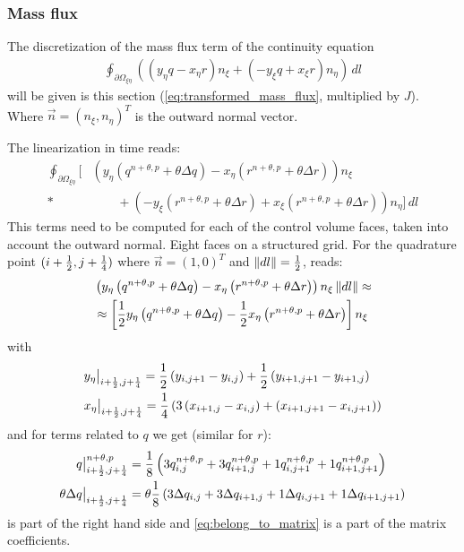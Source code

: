 \subsubsection{Mass flux}
The discretization of the mass flux term of the continuity equation
\begin{align}
    \oint_{\partial\Omega_{\xi\eta}} \left( \left( y_{\eta} q - x_{\eta} r \right)n_\xi + \left( -y_{\xi} q + x_{\xi} r \right) n_\eta \right)\, dl
\end{align}
will be given is this section (\autoref{eq:transformed_mass_flux}, multiplied by $J$).
Where $\vec{n} = (n_\xi, n_\eta)^T$ is the outward normal vector.

The linearization in time reads:
\begin{align}
    \oint_{\partial\Omega_{\xi\eta}} \Big[&\left( y_\eta\left(q^{n+\theta, p} + \theta \Delta q\right) - x_\eta \left( r^{n+\theta, p} + \theta \Delta r  \right)
    \right) n_{\xi}
    \nonumber\\*
    &\qquad  + \left(-y_\xi\left(r^{n+\theta, p} + \theta \Delta r\right) +
      x_\xi\left( r^{n+\theta, p} + \theta \Delta r  \right) \right) n_\eta
      \Big]\, dl
\end{align}
This terms need to be computed for each of the control volume faces, taken into account the outward normal.
Eight faces on a structured grid.
For the quadrature point $(i+\frac{1}{2}, j+\frac{1}{4})$ where $\vec{n} = (1,0)^T$ and $\left\lVert dl \right\rVert = \frac{1}{2}$, reads:
\begin{align}
&\left( y_\eta\left(q^{n+\theta, p} + \theta \Delta q\right) - x_\eta \left( r^{n+\theta, p} + \theta \Delta r  \right)
    \right) n_{\xi}  \left\lVert dl \right\rVert \approx
    \\
  &\approx \left[ \frac{1}{2} y_\eta\left( q^{n+\theta, p} + \theta \Delta q \right)  -
  \frac{1}{2} x_\eta \left( r^{n+\theta, p} + \theta \Delta r  \right) \right] n_\xi
\end{align}
with
\begin{align}
    & y_\eta\big|_{i+\frac{1}{2}, j+\frac{1}{4}} = \frac{1}{2} \left( y_{i,j+1} - y_{i, j} \right) +
    \frac{1}{2} \left( y_{i+1,j+1} - y_{i+1, j} \right)
    \\*
    & x_\eta\big|_{i+\frac{1}{2}, j+\frac{1}{4}} = \frac{1}{4} \left(3 \left( x_{i+1,j} - x_{i, j} \right) +
 \left( x_{i+1,j+1} - x_{i, j+1} \right) \right)
\end{align}
and for terms related to $q$ we get (similar for $r$):
\begin{align}
    q\big|^{n+\theta,p}_{i+\frac{1}{2}, j+\frac{1}{4}} &= \frac{1}{8}\left(3 q^{n+\theta,p}_{i,j} + 3 q^{n+\theta,p}_{i+1,j} + 1 q^{n+\theta,p}_{i,j+1} + 1 q^{n+\theta,p}_{i+1,j+1} \right)
    \label{eq:belong_to_rhs}
    \\
    \theta \Delta q\big|_{i+\frac{1}{2}, j+\frac{1}{4}} &= \theta\frac{1}{8}\left(3 \Delta q_{i,j} + 3 \Delta q_{i+1,j} + 1 \Delta q_{i,j+1} + 1 \Delta q_{i+1,j+1} \right) \label{eq:belong_to_matrix}
\end{align}
 is part of the right hand side and \autoref{eq:belong_to_matrix} is a part of the matrix coefficients.
